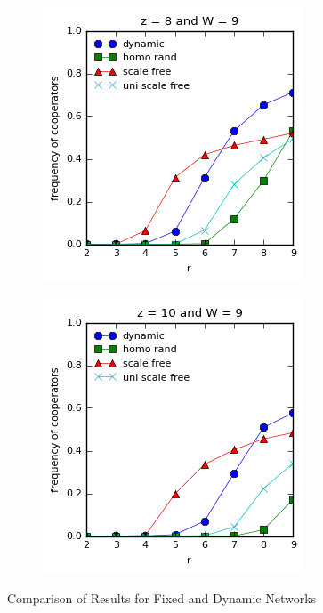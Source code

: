 \documentclass{article}
\begin{document}
\begin{figure}[h]
\begin{subfigure}[b]{0.4\textwidth}
			\caption{}
		\end{subfigure}
		\begin{subfigure}[b]{0.4\textwidth}
			\includegraphics[width=\textwidth]{fig/dynamic/z8dynfix.png}
			\caption{}
		\end{subfigure}
		\begin{subfigure}[b]{0.4\textwidth}
			\includegraphics[width=\textwidth]{fig/dynamic/z10dynfix.png}
			\caption{}
		\end{subfigure}
		\caption{Comparison of Results for Fixed and Dynamic Networks}
		\label{fig:compdynamicfixed}
	\end{figure}
\end{document}
